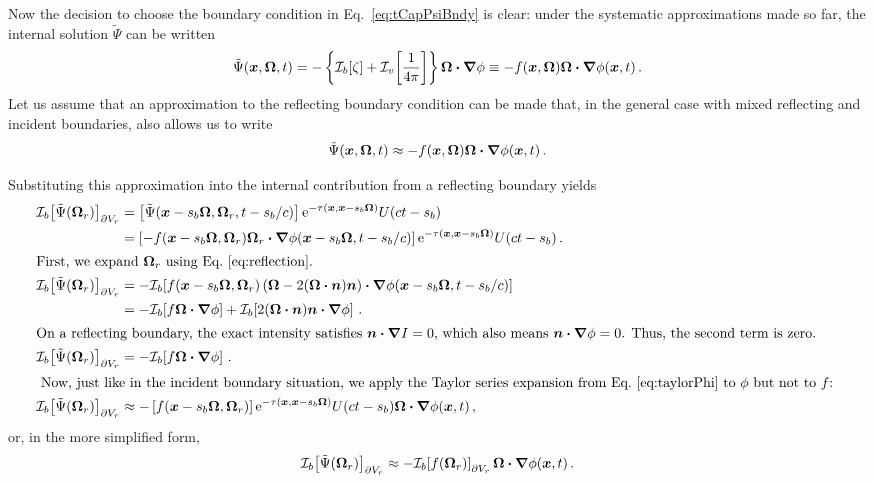 Now the decision to choose the boundary condition in Eq.~\eqref{eq:tCapPsiBndy}
is clear: under the systematic approximations made so far, the internal solution
$\tilde\Psi$ can be written
\begin{equation*}
  \tilde\Psi(\bm{x}, \bm{\Omega}, t)
  = - \left\{ \mathcal{I}_{b}\!\left[\zeta\right] + \mathcal{I}_{v}\!\left[\frac{1}{4\pi}\right]
  \right\} \bm{\Omega}\bm{\cdot} \bm{\nabla} \phi
  \equiv - f(\bm{x}, \bm{\Omega}) \bm{\Omega}\bm{\cdot} \bm{\nabla} \phi(\bm{x}, t)\,.
\end{equation*}
Let us assume that an approximation to the reflecting boundary condition can
be made that, in the general case with mixed reflecting and incident
boundaries, also allows us to write 
\begin{equation*}
  \tilde\Psi(\bm{x}, \bm{\Omega}, t)
  \approx - f(\bm{x}, \bm{\Omega}) \bm{\Omega}\bm{\cdot} \bm{\nabla} \phi(\bm{x}, t)\,.
\end{equation*}

Substituting this approximation into the internal contribution from a reflecting
boundary yields
\begin{align*}
\lopinv{b}{\tilde\Psi(\vec{\Omega}_r)}_{\partial V_r}
  &= \left[\tilde\Psi(\vec{x} - s_b\vec{\Omega}, \vec{\Omega}_r, t - s_b/c) \right]
    \eexp^{ -\tau(\vec{x}, \vec{x} - s_b \vec{\Omega})}
    U(ct - s_b)
\\
  &= \left[-f(\vec{x} - s_b\vec{\Omega}, \vec{\Omega}_r) \vec{\Omega}_r 
  \vd \grad \phi(\vec{x} - s_b\vec{\Omega}, t - s_b/c) \right]
  \eexp^{ -\tau(\vec{x}, \vec{x} - s_b \vec{\Omega})}
  U(ct - s_b) \,.
\\ 
\intertext{First, we expand $\vec{\Omega}_r$ using Eq.~\eqref{eq:reflection}.
}
\lopinv{b}{\tilde\Psi(\vec{\Omega}_r)}_{\partial V_r}
  &= - \lopinv{b}{f(\vec{x} - s_b\vec{\Omega}, \vec{\Omega}_r)
\left(  \vec{\Omega} - 2(\vec{\Omega} \vd \vec{n}) \vec{n} \right)
  \vd \grad \phi(\vec{x} - s_b\vec{\Omega}, t - s_b/c) }
  \\
  &= -\lopinv{b}{f \vec{\Omega} \vd \grad \phi}
  + \lopinv{b}{2(\vec{\Omega} \vd \vec{n}) \vec{n} \vd \grad \phi } \,.
\\ 
\intertext{On a reflecting boundary, the exact intensity satisfies $\vec{n} \vd
\grad I = 0$, which also means $\vec{n} \vd \grad \phi=0$. Thus, the second
term is zero.
}
\lopinv{b}{\tilde\Psi(\vec{\Omega}_r)}_{\partial V_r}
&= -\lopinv{b}{f \vec{\Omega} \vd \grad \phi} \,.
\\ \intertext{ Now, just like in the incident boundary situation, we apply the
Taylor
series expansion from Eq.~\eqref{eq:taylorPhi} to $\phi$ but not to $f$:
}
\lopinv{b}{\tilde\Psi(\vec{\Omega}_r)}_{\partial V_r}
&\approx
-\left[f(\vec{x} - s_b\vec{\Omega}, \vec{\Omega}_r)
  \right]
  \eexp^{ -\tau(\vec{x}, \vec{x} - s_b \vec{\Omega})}
  U(ct - s_b) \vec{\Omega} \vd \grad \phi(\vec{x}, t)\,,
\end{align*}
or, in the more simplified form,
\begin{equation} \label{eq:reflApprox}
\mathcal{I}_{b}\!\left[\tilde\Psi(\bm{\Omega}_r)\right]_{\partial V_r}
\approx  
- \mathcal{I}_{b}\!\left[f(\bm{\Omega}_r)\right]_{\partial V_r}
\bm{\Omega} \bm{\cdot} \bm{\nabla} \phi(\bm{x}, t) \,.
\end{equation}


